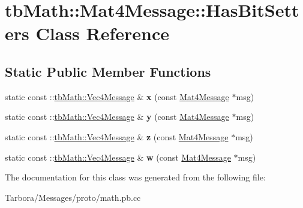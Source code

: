 \hypertarget{classtbMath_1_1Mat4Message_1_1HasBitSetters}{}\section{tb\+Math\+:\+:Mat4\+Message\+:\+:Has\+Bit\+Setters Class Reference}
\label{classtbMath_1_1Mat4Message_1_1HasBitSetters}
\subsection*{Static Public Member Functions}
\begin{DoxyCompactItemize}
\item 
\mbox{\label{classtbMath_1_1Mat4Message_1_1HasBitSetters_a15e51ea1c756a98ccb755b6d30599e5b}} 
static const \+::\hyperlink{classtbMath_1_1Vec4Message}{tb\+Math\+::\+Vec4\+Message} \& {\bfseries x} (const \hyperlink{classtbMath_1_1Mat4Message}{Mat4\+Message} $\ast$msg)
\item 
\mbox{\label{classtbMath_1_1Mat4Message_1_1HasBitSetters_add1d2125e3143f9994fdcc2ff49f9323}} 
static const \+::\hyperlink{classtbMath_1_1Vec4Message}{tb\+Math\+::\+Vec4\+Message} \& {\bfseries y} (const \hyperlink{classtbMath_1_1Mat4Message}{Mat4\+Message} $\ast$msg)
\item 
\mbox{\label{classtbMath_1_1Mat4Message_1_1HasBitSetters_a7619c366db99b1abf33ee731d54d1b1e}} 
static const \+::\hyperlink{classtbMath_1_1Vec4Message}{tb\+Math\+::\+Vec4\+Message} \& {\bfseries z} (const \hyperlink{classtbMath_1_1Mat4Message}{Mat4\+Message} $\ast$msg)
\item 
\mbox{\label{classtbMath_1_1Mat4Message_1_1HasBitSetters_aa245acc369304d2684940518673ed954}} 
static const \+::\hyperlink{classtbMath_1_1Vec4Message}{tb\+Math\+::\+Vec4\+Message} \& {\bfseries w} (const \hyperlink{classtbMath_1_1Mat4Message}{Mat4\+Message} $\ast$msg)
\end{DoxyCompactItemize}


The documentation for this class was generated from the following file\+:\begin{DoxyCompactItemize}
\item 
Tarbora/\+Messages/proto/math.\+pb.\+cc\end{DoxyCompactItemize}
